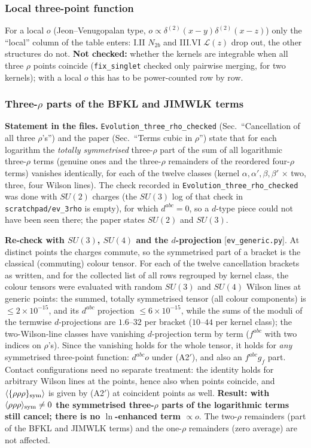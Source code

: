 \documentclass[10pt]{article}
\begin{document}
\subsubsection{Local three-point function}\label{sec:dabc-local}
\noindent For a local $o$ (Jeon--Venugopalan type, $o\propto\delta^{(2)}(x-y)\delta^{(2)}(x-z)$) only the ``local'' column of the table enters: I.II $N_{2b}$ and III.VI $\mathcal{L}(z)$ drop out, the other structures do not. \textbf{Not checked:} whether the kernels are integrable when all three $\rho$ points coincide (\texttt{fix\_singlet} checked only pairwise merging, for two kernels); with a local $o$ this has to be power-counted row by row.

\subsubsection{Three-$\rho$ parts of the BFKL and JIMWLK terms}\label{sec:dabc-evol}
\noindent \textbf{Statement in the files.} \texttt{Evolution\_three\_rho\_checked} (Sec.~``Cancellation of all three $\rho$'s'') and the paper (Sec.~``Terms cubic in $\rho$'') state that for each logarithm the \emph{totally symmetrised} three-$\rho$ part of the sum of all logarithmic three-$\rho$ terms (genuine ones and the three-$\rho$ remainders of the reordered four-$\rho$ terms) vanishes identically, for each of the twelve classes (kernel $\alpha,\alpha',\beta,\beta'$ $\times$ two, three, four Wilson lines). The check recorded in \texttt{Evolution\_three\_rho\_checked} was done with $SU(2)$ charges (the $SU(3)$ log of that check in \texttt{scratchpad/ev\_3rho} is empty), for which $d^{abc}=0$, so a $d$-type piece could not have been seen there; the paper states $SU(2)$ and $SU(3)$.\par
\noindent\textbf{Re-check with $SU(3)$, $SU(4)$ and the $d$-projection} [\texttt{ev\_generic.py}]. At distinct points the charges commute, so the symmetrised part of a bracket is the classical (commuting) colour tensor. For each of the twelve cancellation brackets as written, and for the collected list of all rows regrouped by kernel class, the colour tensors were evaluated with random $SU(3)$ and $SU(4)$ Wilson lines at generic points: the summed, totally symmetrised tensor (all colour components) is $\le2\times10^{-15}$, and its $d^{abc}$ projection $\le6\times10^{-15}$, while the sums of the moduli of the termwise $d$-projections are $1.6$--$32$ per bracket ($10$--$44$ per kernel class); the two-Wilson-line classes have vanishing $d$-projection term by term ($f^{abc}$ with two indices on $\rho$'s). Since the vanishing holds for the whole tensor, it holds for \emph{any} symmetrised three-point function: $d^{abc}o$ under (A2$'$), and also an $f^{abc}g_{f}$ part. Contact configurations need no separate treatment: the identity holds for arbitrary Wilson lines at the points, hence also when points coincide, and $\langle\{\rho\rho\rho\}_{\rm sym}\rangle$ is given by (A2$'$) at coincident points as well. \textbf{Result: with $\langle\rho\rho\rho\rangle_{\rm sym}\neq0$ the symmetrised three-$\rho$ parts of the logarithmic terms still cancel; there is no $\ln$-enhanced term $\propto o$}. The two-$\rho$ remainders (part of the BFKL and JIMWLK terms) and the one-$\rho$ remainders (zero average) are not affected.\par
\end{document}
